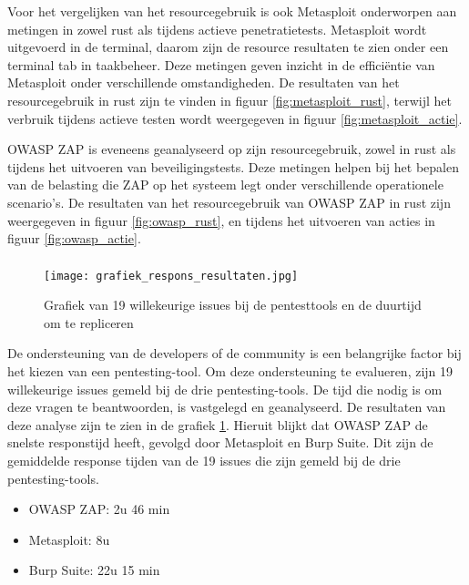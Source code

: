 Voor het vergelijken van het resourcegebruik is ook Metasploit onderworpen aan metingen in zowel rust als tijdens actieve 
penetratietests. Metasploit wordt uitgevoerd in de terminal, daarom zijn de resource resultaten te zien onder een terminal tab 
in taakbeheer. Deze metingen geven inzicht in de efficiëntie van Metasploit onder verschillende omstandigheden. De 
resultaten van het resourcegebruik in rust zijn te vinden in figuur \ref{fig:metasploit_rust}, terwijl het verbruik tijdens 
actieve testen wordt weergegeven in figuur \ref{fig:metasploit_actie}.

OWASP ZAP is eveneens geanalyseerd op zijn resourcegebruik, zowel in rust als tijdens het uitvoeren van beveiligingstests. 
Deze metingen helpen bij het bepalen van de belasting die ZAP op het systeem legt onder verschillende operationele scenario's. 
De resultaten van het resourcegebruik van OWASP ZAP in rust zijn weergegeven in figuur \ref{fig:owasp_rust}, en tijdens het 
uitvoeren van acties in figuur \ref{fig:owasp_actie}.

\subsubsection{}
\begin{figure}
    \centering
    \texttt{[image: grafiek\_respons\_resultaten.jpg]}
    \caption[Grafiek van 19 willekeurige issues bij de pentesttools en de duurtijd om te repliceren]{Grafiek van 19 willekeurige issues bij de pentesttools en de duurtijd om te repliceren}
    \label{fig:respons_grafiek}
\end{figure}
De ondersteuning van de developers of de community is een belangrijke factor bij het kiezen van een pentesting-tool. Om deze ondersteuning 
te evalueren, zijn 19 willekeurige issues gemeld bij de drie pentesting-tools. De tijd die nodig is om deze
vragen te beantwoorden, is vastgelegd en geanalyseerd. De resultaten van deze analyse zijn te zien in de
grafiek \ref{fig:respons_grafiek}. Hieruit blijkt dat OWASP ZAP de snelste responstijd heeft, gevolgd door Metasploit en
Burp Suite. Dit zijn de gemiddelde response tijden van de 19 issues die zijn gemeld bij de drie pentesting-tools.
\begin{itemize}
    \item OWASP ZAP: 2u 46 min
    \item Metasploit: 8u
    \item Burp Suite: 22u 15 min
\end{itemize}

